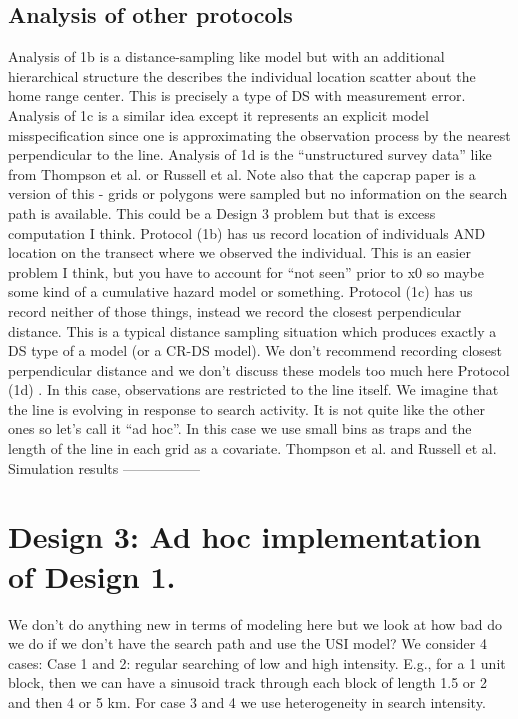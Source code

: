\subsection{Analysis of other protocols}

Analysis of 1b is a distance-sampling like model but with an additional hierarchical structure the describes the individual location scatter about the home range center. This is precisely a type of DS with measurement error. Analysis of 1c is a similar idea except it represents an explicit model misspecification since one is approximating the observation process by the nearest perpendicular to the line.  Analysis of 1d is the ``unstructured survey data'' like from Thompson et al. or Russell et al.  Note also that the capcrap paper is a version of this - grids or polygons were sampled but no information on the search path is available. This could be a Design 3 problem but that is excess computation I think. 
Protocol (1b) has us record location of individuals AND location on the transect where we observed the individual. This is an easier problem I think, but you have to account for ``not seen'' prior  to x0 so maybe some kind of a cumulative hazard model or something. 
Protocol (1c) has us record neither of those things, instead we record the closest perpendicular distance. This is a typical distance sampling situation which produces exactly a DS type of a model (or a CR-DS model). We don't recommend recording closest perpendicular distance and we don't discuss these models too much here
Protocol (1d) . In this case, observations are restricted to the line itself. We imagine that the line is evolving in response to search activity. It is not quite like the other ones so let's call it ``ad hoc''. In this case we use small bins as traps and the length of the line in each grid as a covariate. Thompson et al. and Russell et al.
Simulation results -----------------



\section{ Design 3: Ad hoc implementation of Design 1. }

We don't do anything new in terms of modeling here but we look at how bad do we do if we don't have the search path and use the USI model?  We consider 4 cases: Case 1 and 2: regular searching of low and high intensity. E.g., for a 1 unit block, then we can have a sinusoid track through each block of length 1.5 or 2 and then 4 or 5 km.   For case 3 and 4 we use heterogeneity in search intensity.


